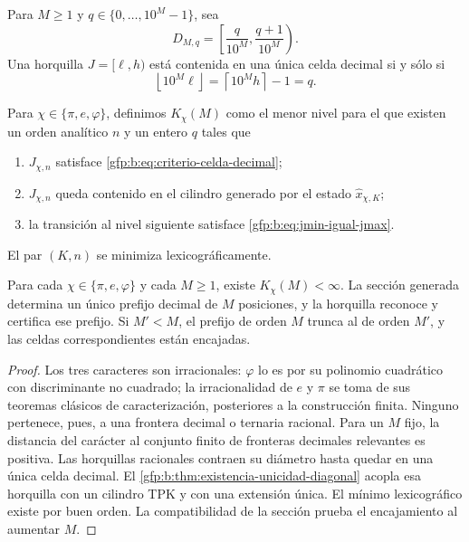Para \(M\geq1\) y \(q\in\{0,\ldots,10^M-1\}\), sea
\[
 D_{M,q}=
 \left[
 \frac{q}{10^M},
 \frac{q+1}{10^M}
 \right).
\]
Una horquilla \(J=[\ell,h)\) está contenida en una única celda decimal si
y sólo si
\begin{equation}
 \boxed{
 \left\lfloor10^M\ell\right\rfloor
 =\left\lceil10^Mh\right\rceil-1=q.}
 \label{gfp:b:eq:criterio-celda-decimal}
\end{equation}

\begin{definition}
Para \(\chi\in\{\pi,e,\varphi\}\), definimos \(K_\chi(M)\) como el menor
nivel para el que existen un orden analítico \(n\) y un entero \(q\) tales
que
\begin{enumerate}
 \item \(J_{\chi,n}\) satisface
       \eqref{gfp:b:eq:criterio-celda-decimal};
 \item \(J_{\chi,n}\) queda contenido en el cilindro generado por el
       estado \(\widehat x_{\chi,K}\);
 \item la transición al nivel siguiente satisface
       \eqref{gfp:b:eq:jmin-igual-jmax}.
\end{enumerate}
El par \((K,n)\) se minimiza lexicográficamente.
\end{definition}

\begin{theorem}
\label{gfp:b:thm:precision-decimal-arbitraria}
Para cada \(\chi\in\{\pi,e,\varphi\}\) y cada \(M\geq1\), existe
\(K_\chi(M)<\infty\). La sección generada determina un único prefijo decimal
de \(M\) posiciones, y la horquilla reconoce y certifica ese prefijo. Si
\(M'<M\), el prefijo de orden \(M\) trunca al de
orden \(M'\), y las celdas correspondientes están encajadas.
\end{theorem}

\begin{proof}
Los tres caracteres son irracionales: \(\varphi\) lo es por su polinomio
cuadrático con discriminante no cuadrado; la irracionalidad de \(e\) y
\(\pi\) se toma de sus teoremas clásicos de caracterización, posteriores a
la construcción finita. Ninguno pertenece, pues, a una frontera decimal o
ternaria racional. Para un \(M\) fijo, la distancia del carácter al conjunto
finito de fronteras decimales relevantes es positiva. Las horquillas
racionales contraen su diámetro hasta quedar en una única celda decimal.
El \cref{gfp:b:thm:existencia-unicidad-diagonal} acopla esa horquilla con un
cilindro TPK y con una extensión única. El mínimo lexicográfico existe por
buen orden. La compatibilidad de la sección prueba el encajamiento al
aumentar \(M\).
\end{proof}

